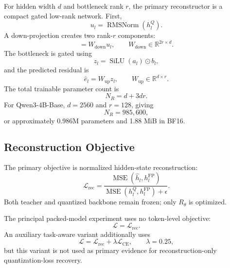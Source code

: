 \documentclass[11pt]{article}
\newcommand{\mse}{\operatorname{MSE}}
\begin{document}
For hidden width $d$ and bottleneck rank $r$, the primary reconstructor is a compact gated low-rank network. First,
\begin{equation}
 u_l = \operatorname{RMSNorm}(h_l^Q).
\end{equation}
A down-projection creates two rank-$r$ components:
\begin{equation}
 [a_l,b_l] = W_{\mathrm{down}}u_l,
 \qquad
 W_{\mathrm{down}}\in\mathbb{R}^{2r\times d}.
\end{equation}
The bottleneck is gated using
\begin{equation}
 z_l = \operatorname{SiLU}(a_l)\odot b_l,
\end{equation}
and the predicted residual is
\begin{equation}
 \hat e_l = W_{\mathrm{up}}z_l,
 \qquad
 W_{\mathrm{up}}\in\mathbb{R}^{d\times r}.
\end{equation}
The total trainable parameter count is
\begin{equation}
 N_R = d + 3dr.
\end{equation}
For Qwen3-4B-Base, $d=2560$ and $r=128$, giving
\begin{equation}
 N_R = 985{,}600,
\end{equation}
or approximately 0.986M parameters and 1.88 MiB in BF16.

\subsection{Reconstruction Objective}

The primary objective is normalized hidden-state reconstruction:
\begin{equation}
 \mathcal{L}_{\mathrm{rec}}
 =
 \frac{\mse(\hat h_l,h_l^{\mathrm{FP}})}
 {\mse(h_l^Q,h_l^{\mathrm{FP}})+\epsilon}.
\end{equation}
Both teacher and quantized backbone remain frozen; only $R_\theta$ is optimized.

The principal packed-model experiment uses no token-level objective:
\begin{equation}
 \mathcal{L} = \mathcal{L}_{\mathrm{rec}}.
\end{equation}
An auxiliary task-aware variant additionally uses
\begin{equation}
 \mathcal{L}
 =
 \mathcal{L}_{\mathrm{rec}}
 + \lambda\mathcal{L}_{\mathrm{CE}},
 \qquad
 \lambda=0.25,
\end{equation}
but this variant is not used as primary evidence for reconstruction-only quantization-loss recovery.
\end{document}
